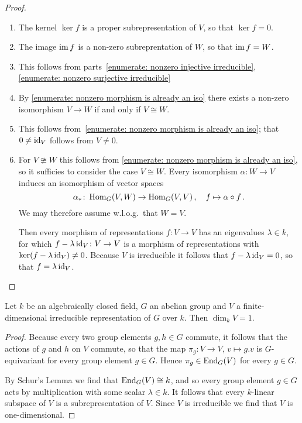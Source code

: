 \begin{proof}
  \leavevmode
  \begin{enumerate}
    \item
      The kernel $\ker f$ is a proper subrepresentation of $V$, so that $\ker f = 0$.
    \item
      The image $\operatorname{im} f$ is a non-zero subreprentation of $W$, so that $\operatorname{im} f = W$.
    \item 
      This follows from parts~\ref*{enumerate: nonzero injective irreducible}, \ref*{enumerate: nonzero surjective irreducible}
    \item
      By \ref*{enumerate: nonzero morphism is already an iso} there exists a non-zero isomorphism $V \to W$ if and only if $V \cong W$.
    \item
      This follows from~\ref*{enumerate: nonzero morphism is already an iso};
      that $0 \neq \operatorname{id}_V$ follows from $V \neq 0$.
    \item
      For $V \ncong W$ this follows from \ref*{enumerate: nonzero morphism is already an iso}, so it sufficies to consider the case $V \cong W$.
      Every isomorphism $\alpha \colon W \to V$ induces an isomorphism of vector spaces
      \[
                \alpha_*
        \colon  \operatorname{Hom}_G(V,W)
        \to     \operatorname{Hom}_G(V,V) \,,
        \quad   f
        \mapsto \alpha \circ f \,.
      \]
      We may therefore assume w.l.o.g.\ that $W = V$.
      
      Then every morphism of representations $f \colon V \to V$ has an eigenvalues $\lambda \in k$, for which $f - \lambda \operatorname{id}_V \colon V \to V$ is a morphism of representations with $\ker(f - \lambda \operatorname{id}_V) \neq 0$.
      Because $V$ is irreducible it follows that $f - \lambda \operatorname{id}_V = 0$, so that $f = \lambda \operatorname{id}_V$.
  \qedhere
  \end{enumerate}
\end{proof}


\begin{corollary}
  \label{corollary: irreducible representation of abelian groups}
  Let $k$ be an algebraically closed field, $G$ an abelian group and $V$ a finite-dimensional irreducible representation of $G$ over $k$.
  Then $\dim_k V = 1$.
\end{corollary}
\begin{proof}
  Because every two group elements $g, h \in G$ commute, it follows that the actions of $g$ and $h$ on $V$ commute, so that the map $\pi_g \colon V \to V$, $v \mapsto g.v$ is $G$-equivariant for every group element $g \in G$.
  Hence $\pi_g \in \operatorname{End}_G(V)$ for every $g \in G$.
  
  By Schur’s Lemma we find that $\operatorname{End}_G(V) \cong k$, and so every group element $g \in G$ acts by multiplication with some scalar $\lambda \in k$.
  It follows that every $k$-linear subspace of $V$ is a subrepresentation of $V$.
  Since $V$ is irreducible we find that $V$ is one-dimensional.
\end{proof}



